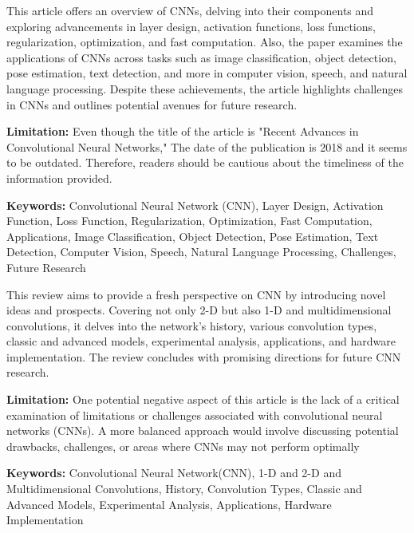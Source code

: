 { 
	This article \cite{Gu:2018} offers an overview of CNNs, delving into their components and exploring advancements in layer design, activation functions, loss functions, regularization, optimization, and fast computation. Also, the paper examines the applications of CNNs across tasks such as image classification, object detection, pose estimation, text detection, and more in computer vision, speech, and natural language processing. Despite these achievements, the article highlights challenges in CNNs and outlines potential avenues for future research.
	
	\bigskip
	
	\textbf{Limitation:} Even though the title of the article is "Recent Advances in Convolutional Neural Networks," The date of the publication is 2018 and it seems to be outdated. Therefore, readers should be cautious about the timeliness of the information provided.
	
	\scriptsize{\textbf{Keywords:} Convolutional Neural Network (CNN), Layer Design, Activation Function, Loss Function, Regularization, Optimization, Fast Computation, Applications, Image Classification, Object Detection, Pose Estimation, Text Detection, Computer Vision, Speech, Natural Language Processing, Challenges, Future Research}
}


{ 
	This review \cite{Li:2021} aims to provide a fresh perspective on CNN by introducing novel ideas and prospects. Covering not only 2-D but also 1-D and multidimensional convolutions, it delves into the network's history, various convolution types, classic and advanced models, experimental analysis, applications, and hardware implementation. The review concludes with promising directions for future CNN research.
	
	\bigskip
	
	\textbf{Limitation:} One potential negative aspect of this article is the lack of a critical examination of limitations or challenges associated with convolutional neural networks (CNNs). A more balanced approach would involve discussing potential drawbacks, challenges, or areas where CNNs may not perform optimally
	
	\scriptsize{\textbf{Keywords:} Convolutional Neural Network(CNN), 1-D and 2-D and Multidimensional Convolutions, History, Convolution Types, Classic and Advanced Models, Experimental Analysis, Applications, Hardware Implementation}
}


